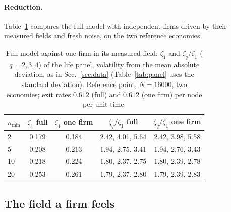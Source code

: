\documentclass[pre,twocolumn,superscriptaddress,nofootinbib]{revtex4-2}
\begin{document}
\paragraph{Reduction.}  Table~\ref{tab:reduction} compares the full model with independent firms driven
by their measured fields and fresh noise, on the two reference economies.

\begin{table}[t]
\caption{Full model against one firm in its measured field: $\zeta_1$ and $\zeta_q/\zeta_1$ ($q=2,3,4$) of the
life panel, volatility from the mean absolute deviation, as in Sec.~\ref{sec:data} (Table~\ref{tab:panel} uses the
standard deviation).  Reference point, $N=16000$, two economies; exit rates $0.612$ (full) and
$0.612$ (one firm) per node per unit time.}
\label{tab:reduction}
\begin{ruledtabular}
\begin{tabular}{lcccc}
$n_{\min}$ & $\zeta_1$ full & $\zeta_1$ one firm & $\zeta_q/\zeta_1$ full & $\zeta_q/\zeta_1$ one firm\\
\hline
2  & 0.179 & 0.184 & 2.42, 4.01, 5.64 & 2.42, 3.98, 5.58\\
5  & 0.208 & 0.213 & 1.94, 2.75, 3.41 & 1.94, 2.76, 3.43\\
10 & 0.218 & 0.224 & 1.80, 2.37, 2.75 & 1.80, 2.39, 2.78\\
20 & 0.253 & 0.261 & 1.79, 2.37, 2.80 & 1.79, 2.39, 2.83\\
\end{tabular}
\end{ruledtabular}
\end{table}

\subsection{The field a firm feels}
\label{app:field}
\end{document}
